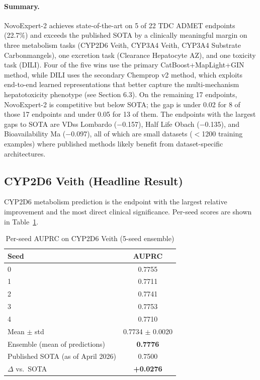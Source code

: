 \documentclass[11pt]{article}
\begin{document}
\paragraph{Summary.}
NovoExpert-2 achieves state-of-the-art on 5 of 22 TDC ADMET endpoints (22.7\%) and exceeds the published SOTA by a clinically meaningful margin on three metabolism tasks (CYP2D6 Veith, CYP3A4 Veith, CYP3A4 Substrate Carbonmangels), one excretion task (Clearance Hepatocyte AZ), and one toxicity task (DILI). Four of the five wins use the primary CatBoost+MapLight+GIN method, while DILI uses the secondary Chemprop v2 method, which exploits end-to-end learned representations that better capture the multi-mechanism hepatotoxicity phenotype (see Section 6.3). On the remaining 17 endpoints, NovoExpert-2 is competitive but below SOTA; the gap is under 0.02 for 8 of those 17 endpoints and under 0.05 for 13 of them. The endpoints with the largest gaps to SOTA are VDss Lombardo ($-$0.157), Half Life Obach ($-$0.135), and Bioavailability Ma ($-$0.097), all of which are small datasets ($<$1200 training examples) where published methods likely benefit from dataset-specific architectures.

\subsection{CYP2D6 Veith (Headline Result)}

CYP2D6 metabolism prediction is the endpoint with the largest relative improvement and the most direct clinical significance. Per-seed scores are shown in Table~\ref{tab:cyp2d6}.

\begin{table}[h]
\centering
\caption{Per-seed AUPRC on CYP2D6 Veith (5-seed ensemble)}
\label{tab:cyp2d6}
\begin{tabular}{lc}
\toprule
Seed & AUPRC \\
\midrule
0 & 0.7755 \\
1 & 0.7711 \\
2 & 0.7741 \\
3 & 0.7753 \\
4 & 0.7710 \\
\midrule
Mean $\pm$ std & 0.7734 $\pm$ 0.0020 \\
Ensemble (mean of predictions) & \textbf{0.7776} \\
\midrule
Published SOTA (as of April 2026) & 0.7500 \\
$\Delta$ vs.\ SOTA & \textbf{+0.0276} \\
\bottomrule
\end{tabular}
\end{table}
\end{document}
